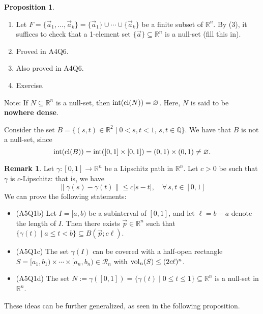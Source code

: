\documentclass[11pt]{article}
\makeatletter
\theoremstyle{definition}
\newtheorem{prop}[thm]{Proposition}
\newtheorem{remark}[thm]{Remark}
\newcommand{\Q}{\ensuremath{\mathbb{Q}}}
\newcommand{\R}{\ensuremath{\mathbb{R}}}
\newenvironment{pf}[1][\proofname]{\par
  \pushQED{\qed}%
  \normalfont \topsep0\p@\relax
  \trivlist
  \item[\hskip\labelsep\itshape
  #1\@addpunct{.}]\ignorespaces
}{%
  \popQED\endtrivlist\@endpefalse
}
\makeatother
\begin{document}
\begin{prop}
\begin{pf}
\begin{enumerate}[(1)]
Let $A = A_1 \cup \cdots \cup A_k \in \widehat{\mathcal{R}}_n$. By sub-additivity of ${\rm vol}_n$, we obtain
$${\rm vol}_n(A) \leq \sum_{i=1}^k {\rm vol}_n(A_i) < \sum_{i=1}^k \frac{\varepsilon}k = \varepsilon$$
Then $U \subseteq A$ with ${\rm vol}_n(A) < \varepsilon$, so $U$ is a null-set.

\item Let $F = \{\vec{a}_1, \dots, \vec{a}_k\} = \{\vec{a}_1\} \cup \cdots \cup \{\vec{a}_k\}$ be a finite subset of $\R^n$. By (3), it suffices to check that a 1-element set $\{\vec{a}\} \subseteq \R^n$ is a null-set (fill this in).

\item Proved in A4Q6.

\item Also proved in A4Q6.

\item Exercise. \qedhere
\end{enumerate}
\vspace{-1.5ex}
Note: If $N \subseteq \R^n$ is a null-set, then ${\rm int}({\rm cl}(N)) = \varnothing$. Here, $N$ is said to be {\bf nowhere dense}.

Consider the set $B = \{(s, t) \in \R^2 \mid 0 < s, t < 1, \, s, t \in \Q\}$. We have that $B$ is not a null-set, since
$${\rm int}({\rm cl}(B)) = {\rm int}([0, 1] \times [0, 1]) = (0, 1) \times (0, 1) \neq \varnothing.$$
\end{pf}
\end{prop}

\begin{remark}
Let $\gamma : [0, 1] \to \R^n$ be a Lipschitz path in $\R^n$. Let $c > 0$ be such that $\gamma$ is $c$-Lipschitz: that is, we have
$$\|\gamma(s) - \gamma(t)\| \leq c|s-t|, \quad \forall\,s, t \in [0, 1]$$
We can prove the following statements:\vspace{-1.5ex}
\begin{itemize}
    \item (A5Q1b) Let $I = [a, b)$ be a subinterval of $[0, 1]$, and let $\ell = b - a$ denote the length of $I$. Then there exists $\vec{p} \in \R^n$ such that $\{\gamma(t) \mid a \leq t < b \} \subseteq B(\vec{p}; c\ell)$.
    \item (A5Q1c) The set $\gamma(I)$ can be covered with a half-open rectangle $S = [a_1, b_1) \times \cdots \times [a_n, b_n) \in \mathcal{R}_n$ with ${\rm vol}_n(S) \leq (2c\ell)^n$.
    \item (A5Q1d) The set $N := \gamma([0, 1]) = \{\gamma(t) \mid 0 \leq t \leq 1\} \subseteq \R^n$ is a null-set in $\R^n$.
\end{itemize}
\vspace{-1.5ex}
These ideas can be further generalized, as seen in the following proposition.
\end{remark}
\end{document}
